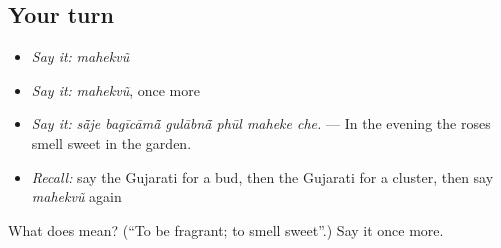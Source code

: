 \subsection*{Your turn}
\begin{itemize}
\raggedright
  \item \emph{Say it:} \emph{mahekvũ}
  \item \emph{Say it:} \emph{mahekvũ}, once more
  \item \emph{Say it:} \emph{sā̃je bagīcāmā̃ gulābnā̃ phūl maheke che.} — In the evening the roses smell sweet in the garden.
  \item \emph{Recall:} say the Gujarati for a bud, then the Gujarati for a cluster, then say \emph{mahekvũ} again
\end{itemize}

\begin{tcolorbox}[breakable,colback=teal!4,colframe=teal!35!black,title={Before you move on}]
What does  mean? (\textquotedblleft{}To be fragrant; to smell sweet\textquotedblright{}.) Say it once more.
\end{tcolorbox}
